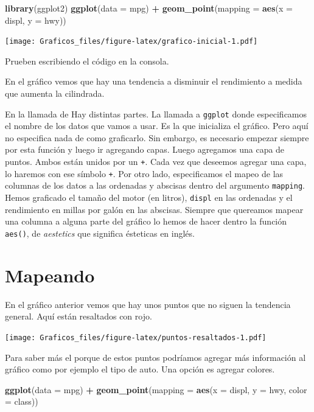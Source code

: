 \documentclass[]{book}
\newenvironment{Shaded}{\begin{snugshade}}{\end{snugshade}}
\newcommand{\DataTypeTok}[1]{\textcolor[rgb]{0.13,0.29,0.53}{#1}}
\newcommand{\KeywordTok}[1]{\textcolor[rgb]{0.13,0.29,0.53}{\textbf{#1}}}
\newcommand{\NormalTok}[1]{#1}
\newcommand{\OperatorTok}[1]{\textcolor[rgb]{0.81,0.36,0.00}{\textbf{#1}}}
\newcommand{\StringTok}[1]{\textcolor[rgb]{0.31,0.60,0.02}{#1}}
\theoremstyle{definition}
\theoremstyle{definition}
\theoremstyle{definition}
\theoremstyle{remark}
\begin{document}
\begin{Shaded}
\begin{Highlighting}[]
\KeywordTok{library}\NormalTok{(ggplot2)}
\KeywordTok{ggplot}\NormalTok{(}\DataTypeTok{data =}\NormalTok{ mpg) }\OperatorTok{+}
\StringTok{ }\KeywordTok{geom_point}\NormalTok{(}\DataTypeTok{mapping =} \KeywordTok{aes}\NormalTok{(}\DataTypeTok{x =}\NormalTok{ displ, }\DataTypeTok{y =}\NormalTok{ hwy))}
\end{Highlighting}
\end{Shaded}

\texttt{[image: Graficos\_files/figure-latex/grafico-inicial-1.pdf]}

Prueben escribiendo el código en la consola.

En el gráfico vemos que hay una tendencia a disminuir el rendimiento a
medida que aumenta la cilindrada.

En la llamada de Hay distintas partes. La llamada a \texttt{ggplot}
donde especificamos el nombre de los datos que vamos a usar. Es la que
inicializa el gráfico. Pero aquí no especifica nada de como graficarlo.
Sin embargo, es necesario empezar siempre por esta función y luego ir
agregando capas. Luego agregamos una capa de puntos. Ambos están unidos
por un \texttt{+}. Cada vez que deseemos agregar una capa, lo haremos
con ese símbolo \texttt{+}. Por otro lado, especificamos el mapeo de las
columnas de los datos a las ordenadas y abscisas dentro del argumento
\texttt{mapping}. Hemos graficado el tamaño del motor (en litros),
\texttt{displ} en las ordenadas y el rendimiento en millas por galón en
las abscisas. Siempre que quereamos mapear una columna a alguna parte
del gráfico lo hemos de hacer dentro la función \texttt{aes()}, de
\emph{aestetics} que significa ésteticas en inglés.

\hypertarget{mapeando}{%
\section{Mapeando}\label{mapeando}}

En el gráfico anterior vemos que hay unos puntos que no siguen la
tendencia general. Aquí están resaltados con rojo.

\texttt{[image: Graficos\_files/figure-latex/puntos-resaltados-1.pdf]}

Para saber más el porque de estos puntos podríamos agregar más
información al gráfico como por ejemplo el tipo de auto. Una opción es
agregar colores.

\begin{Shaded}
\begin{Highlighting}[]
\KeywordTok{ggplot}\NormalTok{(}\DataTypeTok{data =}\NormalTok{ mpg) }\OperatorTok{+}
\StringTok{ }\KeywordTok{geom_point}\NormalTok{(}\DataTypeTok{mapping =} \KeywordTok{aes}\NormalTok{(}\DataTypeTok{x =}\NormalTok{ displ, }\DataTypeTok{y =}\NormalTok{ hwy, }\DataTypeTok{color =}\NormalTok{ class))}
\end{Highlighting}
\end{Shaded}
\end{document}
